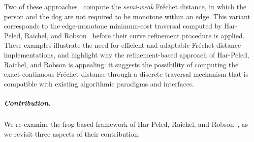 \documentclass[english, thm-restate, notab]{lipics-v2021}
\begin{document}
Two of these approaches~\cite{buchin2017clustering, buchin2020improved} compute the \emph{semi-weak} Fréchet distance, in which the person and the dog are not required to be monotone within an edge. This variant corresponds to the edge-monotone minimum-cost traversal computed by Har-Peled, Raichel, and Robson~\cite{harpeled_et_al:LIPIcs.SoCG.2025.54} before their curve refinement procedure is applied. 
These examples illustrate the need for efficient and adaptable Fréchet distance implementations, and highlight why the refinement-based approach of Har-Peled, Raichel, and Robson is appealing: it suggests the possibility of computing the exact continuous Fréchet distance through a discrete traversal mechanism that is compatible with existing algorithmic paradigms and interfaces.



\subparagraph{Contribution.}
We re-examine the frog-based framework of Har-Peled, Raichel, and Robson~\cite{harpeled_et_al:LIPIcs.SoCG.2025.54}, as we revisit three aspects of their contribution. 
\end{document}
